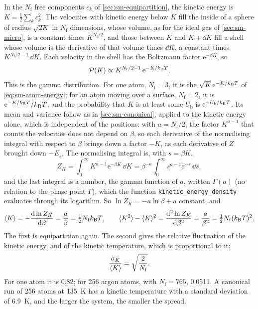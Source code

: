 In the $N_{\mathrm f}$ free components $c_k$ of
\cref{sec:sm-equipartition}, the kinetic energy is $K =
\frac12\sum_kc_k^2$. The velocities with kinetic energy below $K$ fill
the inside of a sphere of radius $\sqrt{2K}$ in $N_{\mathrm f}$
dimensions, whose volume, as for the ideal gas of \cref{sec:sm-micro}, is
a constant times $K^{N_{\mathrm f}/2}$, and those between $K$ and $K +
\dd K$ fill a shell whose volume is the derivative of that volume times
$\dd K$, a constant times $K^{N_{\mathrm f}/2 - 1}\,\dd K$. Each
velocity in the shell has the Boltzmann factor $\mathrm{e}^{-\beta K}$,
so
\begin{equation}
   \mathcal{P}(K) \propto K^{N_{\mathrm f}/2 - 1}\,\mathrm{e}^{-K/k_{\mathrm{B}} T} .
   \label{eq:sm-gamma}
\end{equation}
This is the gamma distribution. For one atom, $N_{\mathrm f} = 3$, it is
the $\sqrt{K}\,\mathrm{e}^{-K/k_{\mathrm{B}} T}$ of \cref{eq:sm-atom-energy}; for an
atom moving over a surface, $N_{\mathrm f} = 2$, it is
$\mathrm{e}^{-K/k_{\mathrm{B}} T}/k_{\mathrm{B}} T$, and the probability that $K$ is at least
some $U_{\mathrm b}$ is $\mathrm{e}^{-U_{\mathrm b}/k_{\mathrm{B}} T}$. Its mean and
variance follow as in \cref{sec:sm-canonical}, applied to the kinetic
energy alone, which is independent of the positions: with $a =
N_{\mathrm f}/2$, the factor $K^{a-1}$ that counts the velocities does not depend on $\beta$, so each
derivative of the normalising integral with respect to $\beta$ brings
down a factor $-K$, as each derivative of $Z$ brought down $-E_s$. The
normalising integral is, with $s = \beta K$,
\begin{equation*}
   Z_K = \int_0^\infty K^{a - 1}\mathrm{e}^{-\beta K}\,\dd K
   = \beta^{-a}\int_0^\infty s^{a - 1}\mathrm{e}^{-s}\,\dd s ,
\end{equation*}
and the last integral is a number, the gamma function of $a$, written
$\Gamma(a)$ (no relation to the phase point $\Gamma$), which
the function \texttt{kinetic\_\allowbreak energy\_\allowbreak density}
evaluates through its logarithm. So $\ln Z_K = -a\ln\beta + \text{a
constant}$, and
\begin{equation*}
   \langle K \rangle = -\frac{\mathrm{d}\ln Z_K}{\mathrm{d}\beta} = \frac a\beta
   = \tfrac12N_{\mathrm f}k_{\mathrm{B}} T , \qquad
   \langle K^2 \rangle - \langle K \rangle^2 = \frac{\mathrm{d}^2\ln Z_K}{\mathrm{d}\beta^2} = \frac a{\beta^2}
   = \tfrac12N_{\mathrm f}(k_{\mathrm{B}} T)^2 .
\end{equation*}
The first is equipartition again. The second gives the relative
fluctuation of the kinetic energy, and of the kinetic temperature, which
is proportional to it:
\begin{equation}
   \frac{\sigma_K}{\langle K \rangle} = \sqrt{\frac{2}{N_{\mathrm f}}} .
   \label{eq:sm-relative}
\end{equation}
For one atom it is 0.82; for 256 argon atoms, with $N_{\mathrm f} = 765$,
0.0511. A canonical run of 256 atoms at \SI{135}{\kelvin} has a kinetic
temperature with a standard deviation of \SI{6.9}{\kelvin}, and the larger
the system, the smaller the spread.

